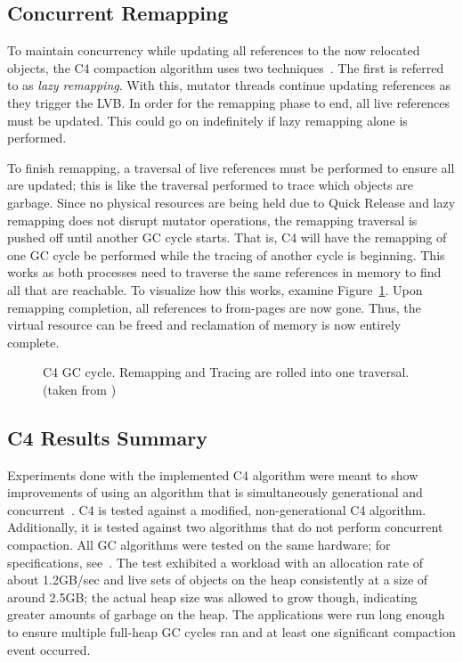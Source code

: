 \documentclass{sig-alternate}
\begin{document}
\subsection{Concurrent Remapping}
\label{sec:c4Remapping}

To maintain concurrency while updating all references to the now relocated
objects, the C4 compaction algorithm uses two techniques~\cite{Tene:C4}. The first is
referred to as \emph{lazy remapping}. With this, mutator
threads continue updating references as they trigger the LVB. In order for
the remapping phase to end, all live references must be updated.
This could go on indefinitely if lazy remapping alone is performed.

To finish remapping, a traversal of live references must be performed to
ensure all are updated; this is like the traversal performed to trace which
objects are garbage. Since no physical resources are being held due
to Quick Release and lazy remapping does not disrupt mutator operations,
the remapping traversal is pushed off until another GC cycle starts. That
is, C4 will have the remapping of one GC cycle be performed while the tracing
of another cycle is beginning. This works as both processes need to traverse
the same references in memory to find all that are reachable. To
visualize how this works, examine Figure~\ref{fig:c4Cycle}. Upon remapping completion, 
all references to from-pages are now gone. Thus, the virtual resource
can be freed and reclamation of memory is now entirely complete. 

\begin{figure}
\centering
{}
\caption{C4 GC cycle. Remapping and Tracing are rolled into one traversal.
(taken from \cite{Tene:C4})}
\label{fig:c4Cycle}
\end{figure}


\subsection{C4 Results Summary}
\label{sec:c4Results}


Experiments done with the implemented C4 algorithm were meant to show improvements
of using an algorithm that is simultaneously generational and concurrent~\cite{Tene:C4}.
C4 is tested against a modified, non-generational C4 algorithm. Additionally,
it is tested against two algorithms that do not perform concurrent compaction. 
All GC algorithms were tested on the same hardware; for specifications, see~\cite{Tene:C4}. 
The test exhibited a workload with
an allocation rate of about 1.2GB/sec and live sets of objects on 
the heap consistently at a size of around 2.5GB; the actual heap size was allowed 
to grow though, indicating greater amounts of garbage on the heap. The applications were run long
enough to ensure multiple full-heap GC cycles ran and at least one
significant compaction event occurred.
\end{document}
